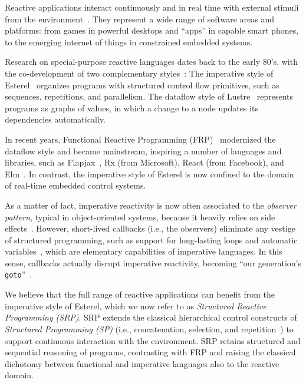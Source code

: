 \documentclass{acm_proc_article-sp}
\newcommand{\code}[1] {{\small{\texttt{#1}}}}
\newcommand{\1}{\;}
\newcommand{\2}{\;\;}
\newcommand{\3}{\;\;\;}
\newcommand{\5}{\;\;\;\;\;}
\begin{document}
Reactive applications interact continuously and in real time with external 
stimuli from the environment~\cite{statecharts.reactive,rp.synchronous}.
They represent a wide range of software areas and platforms: from games in 
powerful desktops and ``apps'' in capable smart phones, to the emerging 
internet of things in constrained embedded systems.

Research on special-purpose reactive languages dates back to the early 80's, 
with the co-development of two complementary 
styles~\cite{rp.twelve,rp.hypothesis}:
%
The imperative style of Esterel~\cite{esterel.ieee91} organizes programs with 
structured control flow primitives, such as sequences, repetitions, and 
parallelism.
%
The dataflow style of Lustre~\cite{lustre.ieee91} represents programs as graphs 
of values, in which a change to a node updates its dependencies automatically.

In recent years, Functional Reactive Programming (FRP)~\cite{frp.principles} 
modernized the dataflow style and became mainstream, inspiring a number of 
languages and libraries, such as Flapjax~\cite{frp.flapjax}, Rx (from 
Microsoft), React (from Facebook), and Elm~\cite{frp.elm}.
%
In contrast, the imperative style of Esterel is now confined to the domain of 
real-time embedded control systems.

As a matter of fact, imperative reactivity is now often associated to the 
\emph{observer pattern}, typical in object-oriented systems, because it heavily 
relies on side effects~\cite{rp.deprecating,rp.rescala}.
%
However, short-lived callbacks (i.e., the observers) eliminate any vestige of 
structured programming, such as support for long-lasting loops and automatic 
variables~\cite{sync_async.cooperative}, which are elementary capabilities of 
imperative languages.
%
In this sense, callbacks actually disrupt imperative reactivity, becoming ``our 
generation's \code{goto}''~\cite{rp.goto,elm.goto}.

We believe that the full range of reactive applications can benefit from the 
imperative style of Esterel, which we now refer to as \emph{Structured Reactive 
Programming (SRP)}.
%
SRP extends the classical hierarchical control constructs of \emph{Structured 
Programming (SP)} (i.e., concatenation, selection, and 
repetition~\cite{dij.notes}) to support continuous interaction with the 
environment.
%
SRP retains structured and sequential reasoning of programs, contrasting with 
FRP and raising the classical dichotomy between functional and imperative 
languages also to the reactive domain.
\end{document}
